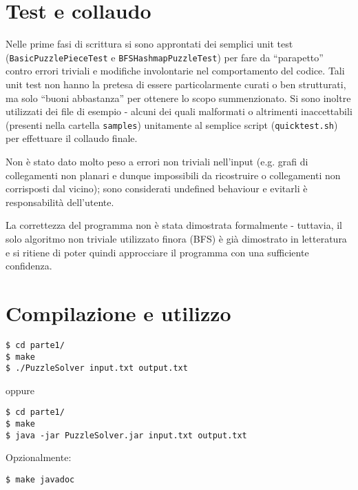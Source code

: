 \documentclass[a4paper]{article}
\begin{document}
\section{Test e collaudo}
Nelle prime fasi di scrittura si sono approntati dei semplici unit test (\texttt{Basic\-Puzzle\-Piece\-Test} e \texttt{BFS\-Hash\-map\-Puzzle\-Test}) per fare da ``parapetto'' contro errori triviali e modifiche involontarie nel comportamento del codice.
Tali unit test non hanno la pretesa di essere particolarmente curati o ben strutturati, ma solo ``buoni abbastanza'' per ottenere lo scopo summenzionato.
Si sono inoltre utilizzati dei file di esempio - alcuni dei quali malformati o altrimenti inaccettabili (presenti nella cartella \texttt{samples}) unitamente al semplice script (\texttt{quicktest.sh}) per effettuare il collaudo finale.

Non \`e stato dato molto peso a errori non triviali nell'input (e.g. grafi di collegamenti non planari e dunque impossibili da ricostruire o collegamenti non corrisposti dal vicino); sono considerati undefined behaviour e evitarli \`e responsabilit\`a dell'utente.

La correttezza del programma non \`e stata dimostrata formalmente - tuttavia, il solo algoritmo non triviale utilizzato finora (BFS) \`e gi\`a dimostrato in letteratura \cite{cormen2001introduction} e si ritiene di poter quindi approcciare il programma con una sufficiente confidenza.

\section{Compilazione e utilizzo}
\begin{verbatim}
$ cd parte1/ 
$ make
$ ./PuzzleSolver input.txt output.txt
\end{verbatim}
oppure
\begin{verbatim}
$ cd parte1/ 
$ make
$ java -jar PuzzleSolver.jar input.txt output.txt
\end{verbatim}

Opzionalmente:
\begin{verbatim}
$ make javadoc
\end{verbatim}


{}

\end{document}
